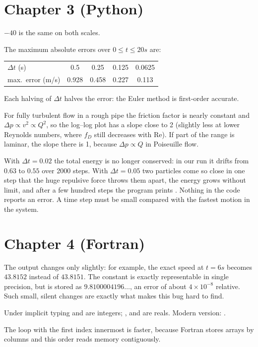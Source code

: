 \section*{Chapter 3 (Python)}
\begin{description}[style=nextline,leftmargin=0pt,font=\normalfont]
\item[\AnswerRef{3.2}] $-40$ is the same on both scales.
\item[\AnswerRef{3.3}] The maximum absolute errors over $0 \le t \le 20\unit{s}$ are:
\begin{center}
\small
\begin{tabular}{@{}lcccc@{}}
\toprule
$\Delta t$ (s) & 0.5 & 0.25 & 0.125 & 0.0625\\
max.\ error (m/s) & 0.928 & 0.458 & 0.227 & 0.113\\
\bottomrule
\end{tabular}
\end{center}
  Each halving of $\Delta t$ halves the error: the Euler method is first-order accurate.
\item[\AnswerRef{3.6}] For fully turbulent flow in a rough pipe the friction factor is nearly constant
  and $\Delta p \propto v^2 \propto Q^2$, so the log--log plot has a slope close to 2
  (slightly less at lower Reynolds numbers, where $f_D$ still decreases with $\mathrm{Re}$).
  If part of the range is laminar, the slope there is 1, because $\Delta p \propto Q$ in
  Poiseuille flow.
\item[\AnswerRef{3.8}] With $\Delta t = 0.02$ the total energy is no longer conserved: in
  our run it drifts from $0.63$ to $0.55$ over 2000 steps. With $\Delta t = 0.05$ two
  particles come so close in one step that the huge repulsive force throws them apart,
  the energy grows without limit, and after a few hundred steps the program prints
  . Nothing in the code reports an error. A time step must be small compared
  with the fastest motion in the system.
\end{description}

\section*{Chapter 4 (Fortran)}
\begin{description}[style=nextline,leftmargin=0pt,font=\normalfont]
\item[\AnswerRef{4.1}] The output changes only slightly: for example, the exact speed at $t = 6\unit{s}$
  becomes $43.8152$ instead of $43.8151$. The constant  is exactly representable
  in single precision, but  is stored as $9.8100004196\ldots$, an error of about
  $4\times10^{-8}$ relative. Such small, silent changes are exactly what makes this bug hard
  to find.
\item[\AnswerRef{4.5}] Under implicit typing  and  are integers; ,  and
   are reals. Modern version: .
\item[\AnswerRef{4.6}] The loop with the first index innermost is faster, because Fortran stores
  arrays by columns and this order reads memory contiguously.
\end{description}

